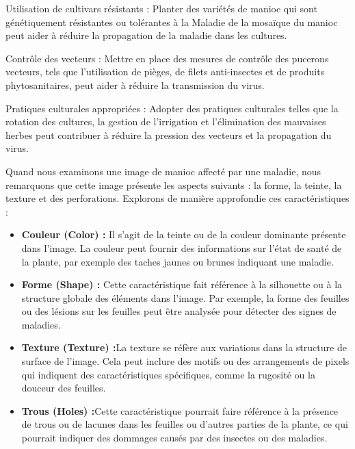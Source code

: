 \documentclass{article}
\begin{document}
\begin{itemize}
			\textemdash  Utilisation de cultivars résistants : Planter des variétés de manioc qui sont génétiquement résistantes ou tolérantes à la Maladie de la mosaïque du manioc peut aider à réduire la propagation de la maladie dans les cultures.
			
			\textemdash  Contrôle des vecteurs : Mettre en place des mesures de contrôle des pucerons vecteurs, tels que l'utilisation de pièges, de filets anti-insectes et de produits phytosanitaires, peut aider à réduire la transmission du virus.
			
			\textemdash  Pratiques culturales appropriées : Adopter des pratiques culturales telles que la rotation des cultures, la gestion de l'irrigation et l'élimination des mauvaises herbes peut contribuer à réduire la pression des vecteurs et la propagation du virus.
		\end{itemize}
		
		Quand nous examinons une image de manioc affecté par une maladie, nous remarquons que cette image présente les aspects suivants : la forme, la teinte, la texture et des perforations.
		Explorons de manière approfondie ces caractéristiques :
		
		\begin{itemize}
			\item  \textbf{ Couleur (Color) :} Il s'agit de la teinte ou de la couleur dominante présente dans l'image. La couleur peut fournir des informations sur l'état de santé de la plante, par exemple des taches jaunes ou brunes indiquant une maladie.
			
			\item  \textbf{ Forme (Shape) :} Cette caractéristique fait référence à la silhouette ou à la structure globale des éléments dans l'image. Par exemple, la forme des feuilles ou des lésions sur les feuilles peut être analysée pour détecter des signes de maladies.
			
			\item  \textbf{ Texture (Texture) :}La texture se réfère aux variations dans la structure de surface de l'image. Cela peut inclure des motifs ou des arrangements de pixels qui indiquent des caractéristiques spécifiques, comme la rugosité ou la douceur des feuilles.
			
			\item  \textbf{ Trous (Holes) :}Cette caractéristique pourrait faire référence à la présence de trous ou de lacunes dans les feuilles ou d'autres parties de la plante, ce qui pourrait indiquer des dommages causés par des insectes ou des maladies.
		\end{itemize}
		
\end{document}
